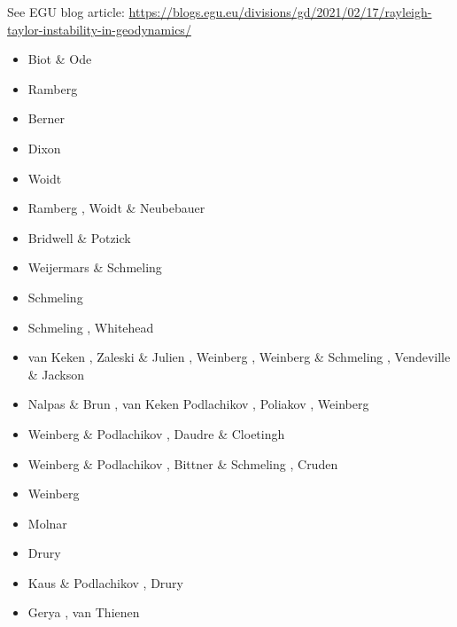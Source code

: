 See EGU blog article: 
\url{https://blogs.egu.eu/divisions/gd/2021/02/17/rayleigh-taylor-instability-in-geodynamics/}

\begin{scriptsize}
\begin{itemize}
\item[\nineteensixtyfive] Biot \& Ode \cite{biod65}
\item[\nineteensixtyeight] Ramberg \cite{ramb68}
\item[\nineteenseventytwo] Berner \etal \cite{bers72}
\item[\nineteenseventyfive] Dixon \cite{dixo75}
\item[\nineteenseventyeight] Woidt \cite{woid78}
\item[\nineteeneighty] Ramberg \cite{ramb80}, Woidt \& Neubebauer \cite{wone80}
\item[\nineteeneightyone] Bridwell \& Potzick \cite{brpo81}
\item[\nineteeneightysix] Weijermars \& Schmeling  \cite{wesc86}
\item[\nineteeneightyseven] Schmeling  \cite{schm87}
\item[\nineteeneightyeight] Schmeling \etal \cite{sccm88}, Whitehead \cite{whit88b}  
\item[\nineteenninetytwo] van Keken \etal \cite{vayv92}, Zaleski \& Julien \cite{zaju92}, 
                    Weinberg \cite{wein92}, Weinberg \& Schmeling \cite{wesc92},
                    Vendeville \& Jackson \cite{veja92}\cite{pepp92}
\item[\nineteenninetythree] Nalpas \& Brun \cite{nabr93}, van Keken \etal \cite{vayv93,vasv93}
                            Podlachikov \etal \cite{potp93}, Poliakov \etal \cite{povp93,pocp93},
                            Weinberg \cite{wein93}
\item[\nineteenninetyfour] Weinberg \& Podlachikov \cite{wepo94}, Daudre \& Cloetingh \cite{dacl94}
\item[\nineteenninetyfive] Weinberg \& Podlachikov \cite{wepo95}, Bittner \& Schmeling \cite{bisc95},
                           Cruden \etal \cite{crks95}
\item[\nineteenninetyseven] Weinberg \cite{wein97}
\item[\nineteenninetyeight] Molnar \etal \cite{mohc98}
\item[\nineteenninetynine] Drury \etal \cite{drdv99}
\item[\twothousandone] Kaus \& Podlachikov \cite{kapo01}, Drury \etal \cite{drvc01}
\item[\twothousandthree] Gerya \etal \cite{geur03}, van Thienen \etal \cite{vavd03}

\end{itemize}
\end{scriptsize}
